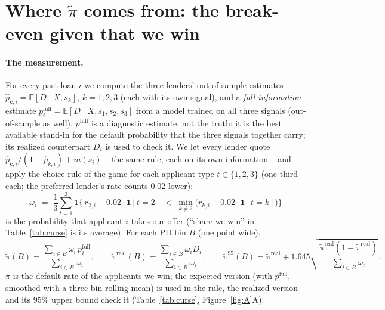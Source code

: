 \documentclass[11pt,a4paper]{article}
\newcommand{\E}{\mathbb{E}}
\begin{document}
\section{Where $\tilde\pi$ comes from: the break-even given that we win}
\paragraph{The measurement.} For every past loan $i$ we compute the three lenders' out-of-sample estimates
$\hat p_{k,i} = \E[D \mid X, s_k]$, $k=1,2,3$ (each with its own signal), and a \emph{full-information} estimate
$p^{\text{full}}_i = \E[D \mid X, s_1, s_2, s_3]$ from a model trained on all three signals (out-of-sample as well).
$p^{\text{full}}$ is a diagnostic estimate, not the truth: it is the best available stand-in for the default probability
that the three signals together carry; its realized counterpart $D_i$ is used to check it. We let every lender quote
$\hat p_{k,i}/(1-\hat p_{k,i}) + m(s_i)$ -- the same rule, each on its own information -- and apply the choice rule of the
game for each applicant type $t\in\{1,2,3\}$ (one third each; the preferred lender's rate counts 0.02 lower):
\begin{equation}
\omega_i \;=\; \frac{1}{3}\sum_{t=1}^{3} \mathbf 1\Big\{\, r_{2,i} - 0.02\cdot\mathbf 1[t=2] \;<\; \min_{k\neq 2}\big(r_{k,i} - 0.02\cdot\mathbf 1[t=k]\big) \Big\}
\end{equation}
is the probability that applicant $i$ takes our offer (``share we win'' in Table~\ref{tab:curse} is its average). For
each PD bin $B$ (one point wide),
\begin{equation}
\tilde\pi(B) = \frac{\sum_{i\in B}\omega_i\, p^{\text{full}}_i}{\sum_{i\in B}\omega_i},
\qquad
\tilde\pi^{\text{real}}(B) = \frac{\sum_{i\in B}\omega_i D_i}{\sum_{i\in B}\omega_i},
\qquad
\tilde\pi^{95}(B) = \tilde\pi^{\text{real}} + 1.645\sqrt{\frac{\tilde\pi^{\text{real}}(1-\tilde\pi^{\text{real}})}{\sum_{i\in B}\omega_i}} .
\end{equation}
$\tilde\pi$ is the default rate of the applicants we win; the expected version (with $p^{\text{full}}$, smoothed with a
three-bin rolling mean) is used in the rule, the realized version and its 95\% upper bound check it (Table~\ref{tab:curse},
Figure~\ref{fig:A}A).
\end{document}
